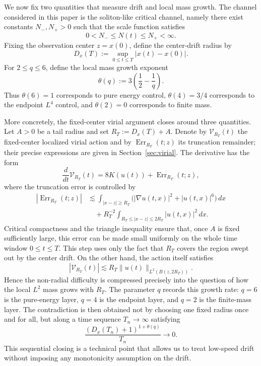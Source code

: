 \documentclass[smallextended,envcountsect,nospthms]{svjour3}
\numberwithin{equation}{section}
\theoremstyle{spbreak}
\theoremstyle{spdefbreak}
\theoremstyle{spdefbreak}
\begin{document}
We now fix two quantities that measure drift and local mass growth. The channel considered in this paper is the soliton-like critical channel, namely there exist constants $N_-,N_+>0$ such that the scale function satisfies
\[
  0<N_-\le N(t)\le N_+<\infty.
\]
Fixing the observation center $z=x(0)$, define the center-drift radius by
\[
  D_x(T):=\sup_{0\le t\le T}|x(t)-x(0)|.
\]
For $2\le q\le6$, define the local mass growth exponent
\[
  \theta(q):=3\left(\frac12-\frac1q\right).
\]
Thus $\theta(6)=1$ corresponds to pure energy control, $\theta(4)=3/4$ corresponds to the endpoint $L^4$ control, and $\theta(2)=0$ corresponds to finite mass.

More concretely, the fixed-center virial argument closes around three quantities. Let $A>0$ be a tail radius and set $R_T:=D_x(T)+A$. Denote by $\mathcal V_{R_T}(t)$ the fixed-center localized virial action and by $\operatorname{Err}_{R_T}(t;z)$ its truncation remainder; their precise expressions are given in Section~\ref{sec:virial}. The derivative has the form
\[
  \frac{d}{dt}\mathcal V_{R_T}(t)
  =8K(u(t))+\operatorname{Err}_{R_T}(t;z),
\]
where the truncation error is controlled by
\begin{align*}
  |\operatorname{Err}_{R_T}(t;z)|
  &\lesssim
  \int_{|x-z|\ge R_T}\bigl(|\nabla u(t,x)|^2+|u(t,x)|^6\bigr)\,dx\\
  &\quad +R_T^{-2}\int_{R_T\le |x-z|\le 2R_T}|u(t,x)|^2\,dx.
\end{align*}
Critical compactness and the triangle inequality ensure that, once $A$ is fixed sufficiently large, this error can be made small uniformly on the whole time window $0\le t\le T$. This step uses only the fact that $R_T$ covers the region swept out by the center drift. On the other hand, the action itself satisfies
\[
  |\mathcal V_{R_T}(t)|
  \lesssim R_T\|u(t)\|_{L^2(B(z,2R_T))}.
\]
Hence the non-radial difficulty is compressed precisely into the question of how the local $L^2$ mass grows with $R_T$. The parameter $q$ records this growth rate: $q=6$ is the pure-energy layer, $q=4$ is the endpoint layer, and $q=2$ is the finite-mass layer. The contradiction is then obtained not by choosing one fixed radius once and for all, but along a time sequence $T_n\to\infty$ satisfying
\[
  \frac{(D_x(T_n)+1)^{1+\theta(q)}}{T_n}\to0.
\]
This sequential closing is a technical point that allows us to treat low-speed drift without imposing any monotonicity assumption on the drift.
\end{document}
